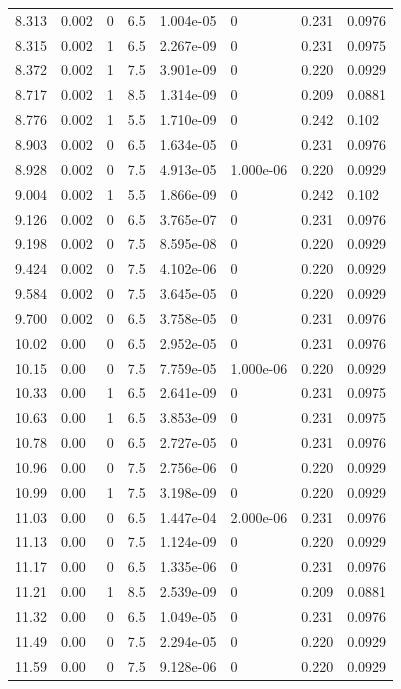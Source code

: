 \documentclass[preview]{standalone}
\begin{document}
{{{\begin{tabular}{L{1.2cm}C{1.2cm} C{0.3cm}C{0.5cm} C{1.4cm}C{1.4cm} C{1.4cm}C{1.4cm}}
  8.313  &  0.002  & 0     & 6.5 &  1.004e-05  & 0  & 0.231 &  0.0976   \\ 
  8.315  &  0.002  & 1     & 6.5 &  2.267e-09  & 0  & 0.231 &  0.0975   \\ 
  8.372  &  0.002  & 1     & 7.5 &  3.901e-09  & 0  & 0.220 &  0.0929   \\ 
  8.717  &  0.002  & 1     & 8.5 &  1.314e-09  & 0  & 0.209 &  0.0881   \\ 
  8.776  &  0.002  & 1     & 5.5 &  1.710e-09  & 0  & 0.242 &  0.102   \\ 
  8.903  &  0.002  & 0     & 6.5 &  1.634e-05  & 0  & 0.231 &  0.0976   \\ 
  8.928  &  0.002  & 0     & 7.5 &  4.913e-05  & 1.000e-06  & 0.220 &  0.0929   \\ 
  9.004  &  0.002  & 1     & 5.5 &  1.866e-09  & 0  & 0.242 &  0.102   \\ 
  9.126  &  0.002  & 0     & 6.5 &  3.765e-07  & 0  & 0.231 &  0.0976   \\ 
  9.198  &  0.002  & 0     & 7.5 &  8.595e-08  & 0  & 0.220 &  0.0929   \\ 
  9.424  &  0.002  & 0     & 7.5 &  4.102e-06  & 0  & 0.220 &  0.0929   \\ 
  9.584  &  0.002  & 0     & 7.5 &  3.645e-05  & 0  & 0.220 &  0.0929   \\ 
  9.700  &  0.002  & 0     & 6.5 &  3.758e-05  & 0  & 0.231 &  0.0976   \\ 
  10.02  &  0.00  & 0     & 6.5 &  2.952e-05  & 0  & 0.231 &  0.0976   \\ 
  10.15  &  0.00  & 0     & 7.5 &  7.759e-05  & 1.000e-06  & 0.220 &  0.0929   \\ 
  10.33  &  0.00  & 1     & 6.5 &  2.641e-09  & 0  & 0.231 &  0.0975   \\ 
  10.63  &  0.00  & 1     & 6.5 &  3.853e-09  & 0  & 0.231 &  0.0975   \\ 
  10.78  &  0.00  & 0     & 6.5 &  2.727e-05  & 0  & 0.231 &  0.0976   \\ 
  10.96  &  0.00  & 0     & 7.5 &  2.756e-06  & 0  & 0.220 &  0.0929   \\ 
  10.99  &  0.00  & 1     & 7.5 &  3.198e-09  & 0  & 0.220 &  0.0929   \\ 
  11.03  &  0.00  & 0     & 6.5 &  1.447e-04  & 2.000e-06  & 0.231 &  0.0976   \\ 
  11.13  &  0.00  & 0     & 7.5 &  1.124e-09  & 0  & 0.220 &  0.0929   \\ 
  11.17  &  0.00  & 0     & 6.5 &  1.335e-06  & 0  & 0.231 &  0.0976   \\ 
  11.21  &  0.00  & 1     & 8.5 &  2.539e-09  & 0  & 0.209 &  0.0881   \\ 
  11.32  &  0.00  & 0     & 6.5 &  1.049e-05  & 0  & 0.231 &  0.0976   \\ 
  11.49  &  0.00  & 0     & 7.5 &  2.294e-05  & 0  & 0.220 &  0.0929   \\ 
  11.59  &  0.00  & 0     & 7.5 &  9.128e-06  & 0  & 0.220 &  0.0929   \\ 
\hline 
\end{tabular} 

}}}
\end{document}
